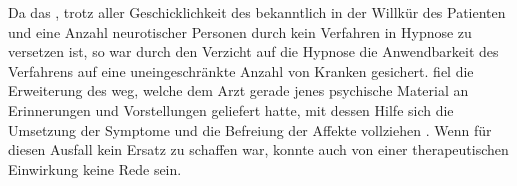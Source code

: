 \documentclass[twoside=true,titlepage=false,open=any, parskip=never, fontsize=10pt, headings=small, chapterprefix=false, appendixprefix=false]{scrbook}
\begin{document}
            
        \pstart
        Da das , trotz aller Geschicklichkeit des
                bekanntlich in der Willkür des Patienten  und eine
                Anzahl neurotischer Personen durch kein Verfahren in Hypnose zu versetzen
               ist, so war durch den Verzicht auf die Hypnose die Anwendbarkeit des Verfahrens
               auf eine uneingeschränkte Anzahl von Kranken gesichert.  fiel die Erweiterung des  weg, welche dem Arzt gerade jenes psychische Material an Erinnerungen und
               Vorstellungen geliefert hatte, mit dessen Hilfe sich die Umsetzung der Symptome
               und die Befreiung der Affekte vollziehen . Wenn für diesen Ausfall kein Ersatz zu schaffen war, konnte
               auch von einer therapeutischen Einwirkung keine Rede sein.
        \pend
    
\end{document}
